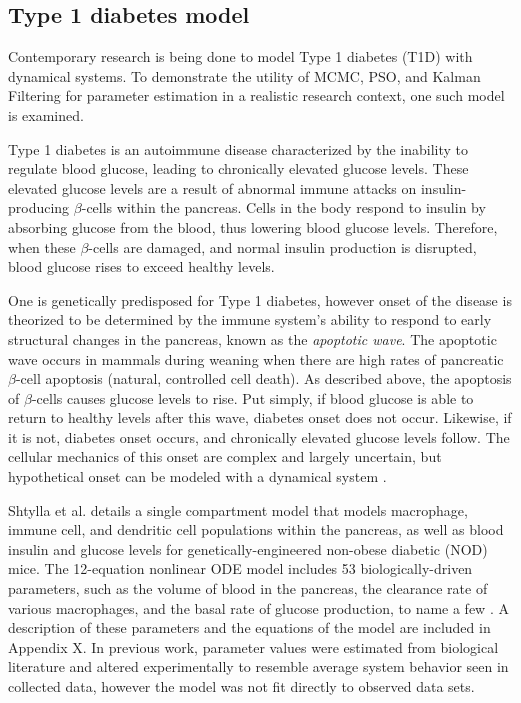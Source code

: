 \documentclass{article}
\begin{document}
\subsection{Type 1 diabetes model}
Contemporary research is being done to model Type 1 diabetes (T1D) with dynamical systems. To demonstrate the utility of MCMC, PSO, and Kalman Filtering for parameter estimation in a realistic research context, one such model is examined.
\par Type 1 diabetes is an autoimmune disease characterized by the inability to regulate blood glucose, leading to chronically elevated glucose levels. These elevated glucose levels are a result of abnormal immune attacks on insulin-producing $\beta$-cells within the pancreas. Cells in the body respond to insulin by absorbing glucose from the blood, thus lowering blood glucose levels. Therefore, when these $\beta$-cells are damaged, and normal insulin production is disrupted, blood glucose rises to exceed healthy levels. 
\par One is genetically predisposed for Type 1 diabetes, however onset of the disease is theorized to be determined by the immune system's ability to respond to early structural changes in the pancreas, known as the \emph{apoptotic wave}. The apoptotic wave occurs in mammals during weaning when there are high rates of pancreatic $\beta$-cell apoptosis (natural, controlled cell death). As described above, the apoptosis of $\beta$-cells causes glucose levels to rise. Put simply, if blood glucose is able to return to healthy levels after this wave, diabetes onset does not occur. Likewise, if it is not, diabetes onset occurs, and chronically elevated glucose levels follow. The cellular mechanics of this onset are complex and largely uncertain, but hypothetical onset can be modeled with a dynamical system \cite{shtylla2019mathematical}.
\par Shtylla et al. details a single compartment model that models macrophage, immune cell, and dendritic cell populations within the pancreas, as well as blood insulin and glucose levels for genetically-engineered non-obese diabetic (NOD) mice. The 12-equation nonlinear ODE model includes 53 biologically-driven parameters, such as the volume of blood in the pancreas, the clearance rate of various macrophages, and the basal rate of glucose production, to name a few \cite{shtylla2019mathematical}. A description of these parameters and the equations of the model are included in Appendix X. In previous work, parameter values were estimated from biological literature and altered experimentally to resemble average system behavior seen in collected data, however the model was not fit directly to observed data sets. 
\end{document}
